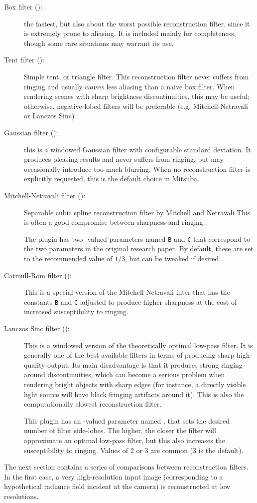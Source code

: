 \begin{description}
\item[Box filter ():]
the fastest, but also about the worst possible
reconstruction filter, since it is extremely prone to aliasing.
It is included mainly for completeness, though some rare situations
may warrant its use.
\item[Tent filter ():]
Simple tent, or triangle filter. This reconstruction filter never
suffers from ringing and usually causes less aliasing than a naive
box filter. When rendering scenes with sharp brightness discontinuities,
this may be useful; otherwise, negative-lobed filters will be preferable
(e.g. Mitchell-Netravali or Lanczos Sinc)

\item[Gaussian filter ():]
this is a windowed Gaussian filter with configurable standard deviation.
It produces pleasing results and never suffers from ringing, but may
occasionally introduce too much blurring.
When no reconstruction filter is explicitly requested, this is the default
choice in Mitsuba.
\item[Mitchell-Netravali filter ():]
Separable cubic spline reconstruction filter by Mitchell and Netravali
\cite{Mitchell:1988:Reconstruction}
This is often a good compromise between sharpness and ringing.

The plugin has two -valued parameters named \texttt{B} and \texttt{C} that
correspond to the two parameters in the original research paper. By default, these
are set to the recommended value of $1/3$, but can be tweaked if desired.

\item[Catmull-Rom filter ():]
This is a special version of the Mitchell-Netravali filter that has the
constants \texttt{B} and \texttt{C} adjusted to produce higher sharpness at the
cost of increased susceptibility to ringing.

\item[Lanczos Sinc filter ():]
This is a windowed version of the theoretically optimal low-pass filter.
It is generally one of the best available filters in terms of producing sharp
high-quality output. Its main disadvantage is that it produces strong ringing around
discontinuities, which can become a serious problem when rendering bright objects
with sharp edges (for instance, a directly visible light source will have black
fringing artifacts around it).
This is also the computationally slowest reconstruction filter.

This plugin has an -valued parameter named , that
sets the desired number of filter side-lobes. The higher, the closer
the filter will approximate an optimal low-pass filter, but this also
increases the susceptibility to ringing. Values of 2 or 3 are common (3 is the default).
\end{description}
The next section contains a series of comparisons between reconstruction filters. In the first
case, a very high-resolution input image (corresponding to a hypothetical radiance field
incident at the camera) is reconstructed at low resolutions.

